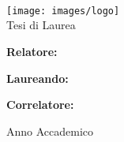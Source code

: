 %
%

\usepackage[\languages]{babel}
\usepackage[
  plainpages=false,
  pdfpagelabels,
  pdftitle={\mytitle},
  pagebackref,
  pdfauthor={\myauthor},
  pdfkeywords={\keywords}
]{hyperref}
\usepackage{memhfixc}



\title{\mytitle}
\author{\myauthor}

\ifx\mydate\undefined
\else
\date{\mydate}
\fi


\ifx\theme\undefined
\else
\usetheme{\theme}
\fi

\VerbatimFootnotes


\chapterstyle{\mychapterstyle}
\pagestyle{\mypagestyle}



\frontmatter
\thispagestyle{empty}

\noindent \begin{center}
  \textsc{\huge \university} \\
  \vspace{1.0cm}
  \textsc{\LARGE \faculty} \\
  {\large \course} \\
  \vspace{1.0cm}
  \texttt{[image: images/logo]} \\
  \vspace{0.5cm}
  {\Large Tesi di Laurea} \\
  \textbf{\huge \formattedtitle}
\end{center}

\vfill
\noindent \textbf{\Large Relatore:}

\noindent {\Large \enskip\supervisor}{\Large \hfill}\textbf{\Large Laureando:}

\noindent \textbf{\Large Correlatore:}{\Large \hfill}{\Large \myauthor\enskip}


\vfill

\noindent \begin{center}
  {\Large Anno Accademico \academicyear}
\end{center}

\clearpage

\setcounter{tocdepth}{\tocdepth}
\tableofcontents
\listoffigures
\listoftables


\mainmatter
